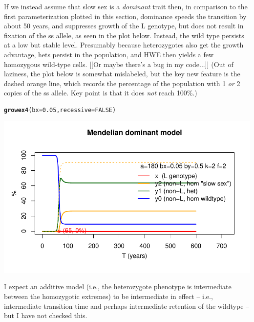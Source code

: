 \documentclass{article}\usepackage[]{graphicx}\usepackage[]{color}
\makeatletter
\def\maxwidth{ %
  \ifdim\Gin@nat@width>\linewidth
    \linewidth
  \else
    \Gin@nat@width
  \fi
}
\newcommand{\hlnum}[1]{\textcolor[rgb]{0.686,0.059,0.569}{#1}}%
\newcommand{\hlstd}[1]{\textcolor[rgb]{0.345,0.345,0.345}{#1}}%
\newcommand{\hlkwc}[1]{\textcolor[rgb]{0.333,0.667,0.333}{#1}}%
\newcommand{\hlkwd}[1]{\textcolor[rgb]{0.737,0.353,0.396}{\textbf{#1}}}%
\newenvironment{kframe}{%
 \def\at@end@of@kframe{}%
 \ifinner\ifhmode%
  \def\at@end@of@kframe{\end{minipage}}%
  \begin{minipage}{\columnwidth}%
 \fi\fi%
 \def\FrameCommand##1{\hskip\@totalleftmargin \hskip-\fboxsep
 \colorbox{shadecolor}{##1}\hskip-\fboxsep
     \hskip-\linewidth \hskip-\@totalleftmargin \hskip\columnwidth}%
 \MakeFramed {\advance\hsize-\width
   \@totalleftmargin\z@ \linewidth\hsize
   \@setminipage}}%
 {\par\unskip\endMakeFramed%
 \at@end@of@kframe}
\newenvironment{knitrout}{}{} %
\makeatother
\begin{document}
If we instead assume that slow sex is a \textit{dominant} trait then, in comparison to the first
parameterization plotted in this section, dominance speeds the transition by about 50 years, and
suppresses growth of the L genotype, but does not result in fixation of the ss allele, as seen in
the plot below.  Instead, the wild type persists at a low but stable level.  Presumably because
heterozygotes also get the growth advantage, hets persist in the population, and HWE then yields 
a few homozygous wild-type cells.  [[Or maybe there's a bug in my code...]]  (Out of laziness, 
the plot below is somewhat mislabeled, but the key new feature is the dashed orange line, which 
records the percentage of the population with 1 \textit{or} 2 copies of the ss allele.  Key 
point is that it does \textit{not} reach 100\%.)

\begin{knitrout}\footnotesize
{}\color{fgcolor}\begin{kframe}
\begin{alltt}
\hlkwd{growex4}\hlstd{(}\hlkwc{bx}\hlstd{=}\hlnum{0.05}\hlstd{,}\hlkwc{recessive}\hlstd{=}\hlnum{FALSE}\hlstd{)}
\end{alltt}
\end{kframe}

{\centering \includegraphics[width=\maxwidth]{asex-figs-knitr/unnamed-chunk-25-1} 

}



\end{knitrout}

I expect an additive model (i.e., the heterozygote phenotype is intermediate between the homozygotic
extremes) to be intermediate in effect -- i.e., intermediate transition time and perhaps
intermediate retention of the wildtype -- but I have not checked this.
\end{document}
